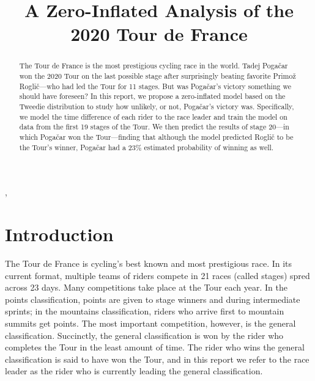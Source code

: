 \documentclass[aos,preprint]{imsart}
\begin{document}
\begin{frontmatter}
\title{A Zero-Inflated Analysis of the 2020 Tour de France}

\begin{aug}
\author{ },

\runauthor{}


\address{Department of Statistics\\
University of British Columbia\\
Vancouver, BC, Canada V6T 1Z4\\
E-mail: \normalfont
\href{mailto:gian.diluvi@stat.ubc.ca}{gian.diluvi@stat.ubc.ca}}

\end{aug}

\begin{abstract}
The Tour de France is the most prestigious cycling race in the world. Tadej Pogačar won the 2020 Tour on the last possible stage after surprisingly beating favorite Primož Roglič---who had led the Tour for 11 stages. But was Pogačar's victory something we should have foreseen? In this report, we propose a zero-inflated model based on the Tweedie distribution to study how unlikely, or not, Pogačar's victory was. Specifically, we model the time difference of each rider to the race leader and train the model on data from the first 19 stages of the Tour. We then predict the results of stage 20---in which Pogačar won the Tour---finding that although the model predicted Roglič to be the Tour's winner, Pogačar had a 23\% estimated probability of winning as well.
\end{abstract}



\end{frontmatter}

\section{Introduction} \label{sec:intro}


The Tour de France is cycling's best known and most prestigious race. In its current format, multiple teams of riders compete in 21 races (called stages) spred across 23 days. Many competitions take place at the Tour each year. In the points classification, points are given to stage winners and during intermediate sprints; in the mountains classification, riders who arrive first to mountain summits get points. The most important competition, however, is the general classification. Succinctly, the general classification is won by the rider who completes the Tour in the least amount of time. The rider who wins the general classification is said to have won the Tour, and in this report we refer to the race leader as the rider who is currently leading the general classification. \\
\end{document}
